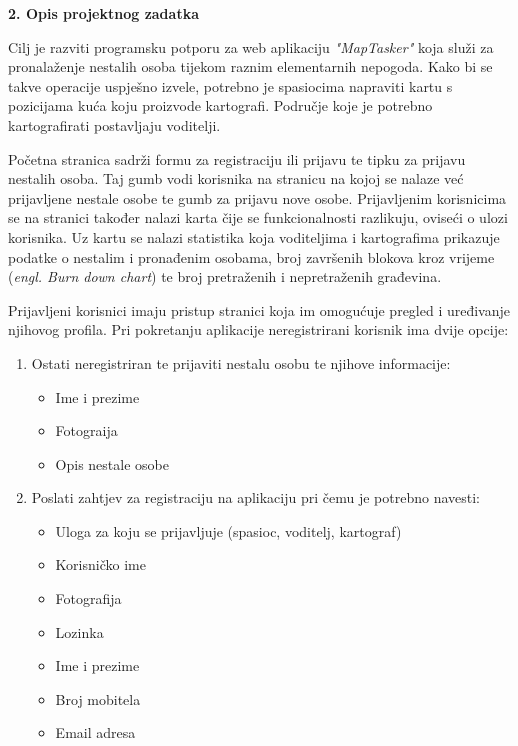 \documentclass{article}
\begin{document}
			\setlength{\parindent}{30pt}
			\begin{flushleft}
				\huge{\textbf{2. Opis projektnog zadatka}}
			\end{flushleft}
			\par
			Cilj je razviti programsku potporu za web aplikaciju \textit{"MapTasker"} koja služi za pronalaženje nestalih osoba tijekom raznim elementarnih nepogoda. Kako bi se takve operacije uspješno izvele, potrebno je spasiocima napraviti kartu s pozicijama kuća koju proizvode kartografi. Područje koje je potrebno kartografirati postavljaju voditelji.
			
			Početna stranica sadrži formu za registraciju ili prijavu te tipku za prijavu nestalih osoba. Taj gumb vodi korisnika na stranicu na kojoj se nalaze već prijavljene nestale osobe te gumb za prijavu nove osobe. Prijavljenim korisnicima se na stranici također nalazi karta čije se funkcionalnosti razlikuju, oviseći o ulozi korisnika. Uz kartu se nalazi statistika koja voditeljima i kartografima prikazuje podatke o nestalim i pronađenim osobama, broj završenih blokova kroz vrijeme (\textit{engl. Burn down chart}) te broj pretraženih i nepretraženih građevina.
			
			Prijavljeni korisnici imaju pristup stranici koja im omogućuje pregled i uređivanje njihovog profila.
			Pri pokretanju aplikacije neregistrirani korisnik ima dvije opcije:
			\begin{enumerate}
				\item Ostati neregistriran te prijaviti nestalu osobu te njihove informacije:
				\begin{itemize}
					\item Ime i prezime
					\item Fotograija
					\item Opis nestale osobe
				\end{itemize}
				\item Poslati zahtjev za registraciju na aplikaciju pri čemu je potrebno navesti:
				\begin{itemize}
					\item Uloga za koju se prijavljuje (spasioc, voditelj, kartograf)
					\item Korisničko ime
					\item Fotografija
					\item Lozinka
					\item Ime i prezime
					\item Broj mobitela
					\item Email adresa
				\end{itemize}
			\end{enumerate}
			
\end{document}
